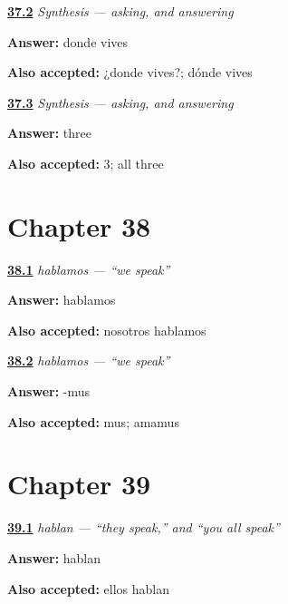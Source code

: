 \noindent\begin{minipage}[t]{\linewidth}
\raggedright
\hyperlink{review-ES-C07-sintesis-preguntar-where}{\textbf{37.2}} \emph{Synthesis — asking, and answering}\par
\small \textbf{Answer:} donde vives\par
\footnotesize \textbf{Also accepted:} ¿donde vives?; dónde vives
\end{minipage}\par\medskip

\noindent\begin{minipage}[t]{\linewidth}
\raggedright
\hyperlink{review-ES-C07-sintesis-preguntar-families}{\textbf{37.3}} \emph{Synthesis — asking, and answering}\par
\small \textbf{Answer:} three\par
\footnotesize \textbf{Also accepted:} 3; all three
\end{minipage}\par\medskip

\section*{Chapter 38}

\noindent\begin{minipage}[t]{\linewidth}
\raggedright
\hyperlink{review-ES-C07-hablamos-form}{\textbf{38.1}} \emph{hablamos — \textquotedblleft{}we speak\textquotedblright{}}\par
\small \textbf{Answer:} hablamos\par
\footnotesize \textbf{Also accepted:} nosotros hablamos
\end{minipage}\par\medskip

\noindent\begin{minipage}[t]{\linewidth}
\raggedright
\hyperlink{review-ES-C07-hablamos-latin}{\textbf{38.2}} \emph{hablamos — \textquotedblleft{}we speak\textquotedblright{}}\par
\small \textbf{Answer:} -mus\par
\footnotesize \textbf{Also accepted:} mus; amamus
\end{minipage}\par\medskip

\section*{Chapter 39}

\noindent\begin{minipage}[t]{\linewidth}
\raggedright
\hyperlink{review-ES-C07-hablan-form}{\textbf{39.1}} \emph{hablan — \textquotedblleft{}they speak,\textquotedblright{} and \textquotedblleft{}you all speak\textquotedblright{}}\par
\small \textbf{Answer:} hablan\par
\footnotesize \textbf{Also accepted:} ellos hablan
\end{minipage}\par\medskip

